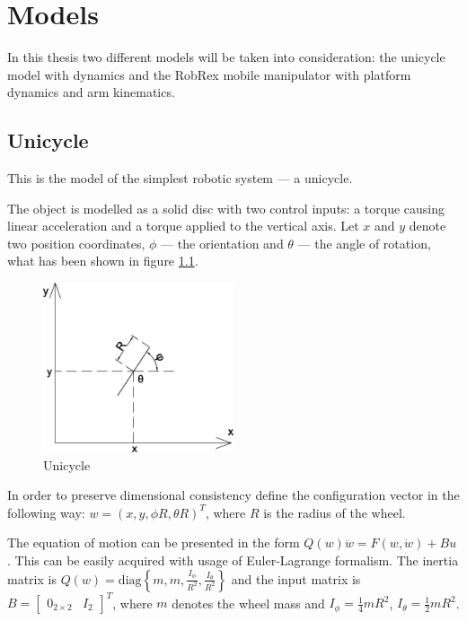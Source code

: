 \chapter{Models}
\label{ch:model}
In this thesis two different models will be taken into consideration: the unicycle model
with dynamics and the RobRex mobile manipulator with platform dynamics and arm kinematics.
\section{Unicycle}
This is the model of the simplest robotic system --- a unicycle.

The object is modelled as a solid disc with two control inputs:
a torque causing linear acceleration and a torque applied to the vertical axis.
Let $x$ and $y$ denote two position coordinates, $\phi$ --- the orientation
and $\theta$ --- the angle of rotation, what has been shown in figure \ref{fig:uni_sch}.
\begin{figure}
\centering
\includegraphics[width=0.5\textwidth]{img/uni.eps}
\caption{Unicycle}
\label{fig:uni_sch}
\end{figure}
In order to preserve dimensional consistency define the configuration vector in the following way:
$w = (x, y, \phi R, \theta R)^T$, where $R$ is the radius of the wheel.

The equation of motion can be presented
in the form $Q(w)\ddot w =F(w, \dot w)+Bu$. This can be easily acquired with usage of
Euler-Lagrange formalism. The inertia matrix is
$Q(w)=\mathrm{diag}\left\{m, m, \frac{I_\phi}{R^2}, \frac{I_\theta}{R^2}\right\}$ and
the input matrix is $B=\begin{bmatrix}
0_{2 \times 2} & I_2
\end{bmatrix}^T$, where $m$ denotes the wheel mass and $I_\phi=\frac{1}{4}mR^2$,
$I_\theta=\frac{1}{2}mR^2$.

